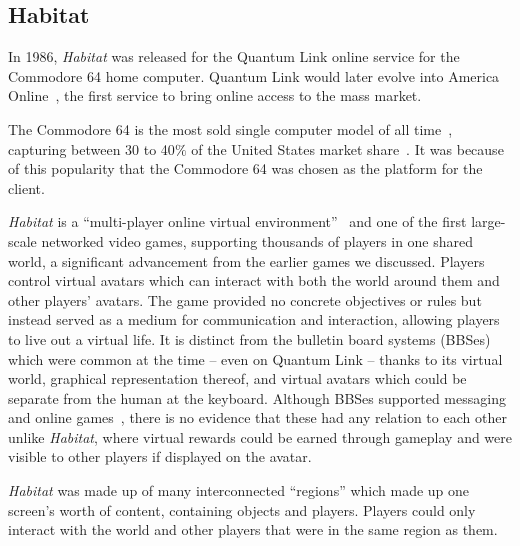 \subsection{Habitat}\label{subsec:habitat}

In 1986, \textit{Habitat} was released for the Quantum Link online service for the Commodore 64 home computer. Quantum Link would later evolve into America Online~\cite{nollinger}, the first service to bring online access to the mass market.

The Commodore 64 is the most sold single computer model of all time~\cite{guinnessc64}, capturing between 30 to 40$\%$ of the United States market share~\cite{marketshare}. It was because of this popularity that the Commodore 64 was chosen as the platform for the client.

\textit{Habitat} is a ``multi-player online virtual environment''~\cite{morningstar} and one of the first large-scale networked video games, supporting thousands of players in one shared world, a significant advancement from the earlier games we discussed. Players control virtual avatars which can interact with both the world around them and other players' avatars. The game provided no concrete objectives or rules but instead served as a medium for communication and interaction, allowing players to live out a virtual life. It is distinct from the bulletin board systems (BBSes) which were common at the time -- even on Quantum Link -- thanks to its virtual world, graphical representation thereof, and virtual avatars which could be separate from the human at the keyboard. Although BBSes supported messaging and online games~\cite{pcmagbbs}, there is no evidence that these had any relation to each other unlike \textit{Habitat}, where virtual rewards could be earned through gameplay and were visible to other players if displayed on the avatar.

\textit{Habitat} was made up of many interconnected ``regions'' which made up one screen's worth of content, containing objects and players. Players could only interact with the world and other players that were in the same region as them.

